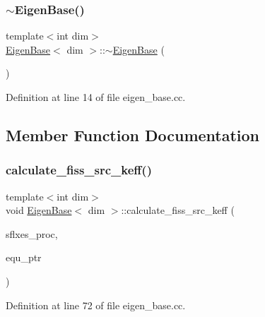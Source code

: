 \subsubsection{\texorpdfstring{$\sim$\+Eigen\+Base()}{~EigenBase()}}
{\footnotesize\ttfamily template$<$int dim$>$ \\
\hyperlink{class_eigen_base}{Eigen\+Base}$<$ dim $>$\+::$\sim$\hyperlink{class_eigen_base}{Eigen\+Base} (\begin{DoxyParamCaption}{ }\end{DoxyParamCaption})\hspace{0.3cm}{\ttfamily [virtual]}}



Definition at line 14 of file eigen\+\_\+base.\+cc.



\subsection{Member Function Documentation}
\mbox{\label{class_eigen_base_a325ceda011337e2416cef726bbd5d28f}} 
\subsubsection{\texorpdfstring{calculate\+\_\+fiss\+\_\+src\+\_\+keff()}{calculate\_fiss\_src\_keff()}}
{\footnotesize\ttfamily template$<$int dim$>$ \\
void \hyperlink{class_eigen_base}{Eigen\+Base}$<$ dim $>$\+::calculate\+\_\+fiss\+\_\+src\+\_\+keff (\begin{DoxyParamCaption}\item[{std\+::vector$<$ Vector$<$ double $>$ $>$ \&}]{sflxes\+\_\+proc,  }\item[{std\+\_\+cxx11\+::shared\+\_\+ptr$<$ \hyperlink{class_equation_base}{Equation\+Base}$<$ dim $>$ $>$}]{equ\+\_\+ptr }\end{DoxyParamCaption})\hspace{0.3cm}{\ttfamily [protected]}}



Definition at line 72 of file eigen\+\_\+base.\+cc.

\mbox{\label{class_eigen_base_a8a9ef8878e5b7199aa662f2b61b2d864}} 

